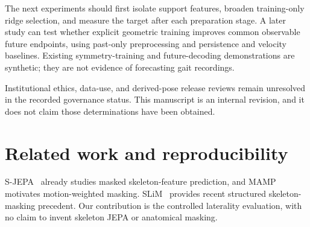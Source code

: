 \documentclass{article}
\begin{document}
The next experiments should first isolate support features, broaden training-only ridge selection, and measure the target after each preparation stage. A later study can test whether explicit geometric training improves common observable future endpoints, using past-only preprocessing and persistence and velocity baselines. Existing symmetry-training and future-decoding demonstrations are synthetic; they are not evidence of forecasting gait recordings.

Institutional ethics, data-use, and derived-pose release reviews remain unresolved in the recorded governance status. This manuscript is an internal revision, and it does not claim those determinations have been obtained.

\section{Related work and reproducibility}\label{related-work-and-reproducibility}

S-JEPA~\citep{ref04} already studies masked skeleton-feature prediction, and MAMP~\citep{ref05} motivates motion-weighted masking. SLiM~\citep{ref06} provides recent structured skeleton-masking precedent. Our contribution is the controlled laterality evaluation, with no claim to invent skeleton JEPA or anatomical masking.
\end{document}
